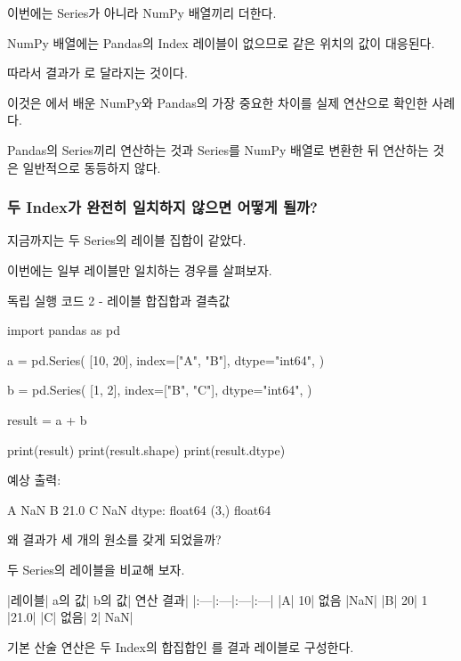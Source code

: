 이번에는 Series가 아니라 NumPy 배열끼리 더한다.

NumPy 배열에는 Pandas의 Index 레이블이 없으므로 같은 위치의 값이 대응된다.

따라서 결과가 \zsh{[11, 22]}로 달라지는 것이다.

이것은 에서 배운 NumPy와 Pandas의 가장 중요한 차이를 실제 연산으로 확인한 사례다.

Pandas의 Series끼리 연산하는 것과 Series를 NumPy 배열로 변환한 뒤 연산하는 것은 일반적으로 동등하지 않다.

\subsubsection{두 Index가 완전히 일치하지 않으면 어떻게 될까?}

지금까지는 두 Series의 레이블 집합이 같았다.

이번에는 일부 레이블만 일치하는 경우를 살펴보자.

\begin{dhknote}
\begin{dhksmry}[centered]
독립 실행 코드 2 - 레이블 합집합과 결측값
\end{dhksmry}
\end{dhknote}

\begin{dhkcode}
import pandas as pd

a = pd.Series(
    [10, 20],
    index=["A", "B"],
    dtype="int64",
)

b = pd.Series(
    [1, 2],
    index=["B", "C"],
    dtype="int64",
)

result = a + b

print(result)
print(result.shape)
print(result.dtype)
\end{dhkcode}

예상 출력:

\begin{dhkzsh}
A     NaN
B    21.0
C     NaN
dtype: float64
(3,)
float64
\end{dhkzsh}

왜 결과가 세 개의 원소를 갖게 되었을까?

두 Series의 레이블을 비교해 보자.

\begin{dhktable}
|레이블|	a의 값|	b의 값|	연산 결과|
|:---|:---|:---|:---|
|A|	10|	없음	|NaN|
|B|	20|	1	|21.0|
|C|	없음|	2|	NaN|
\end{dhktable}

기본 산술 연산은 두 Index의 합집합인 \zsh{["A", "B", "C"]}를 결과 레이블로 구성한다.

